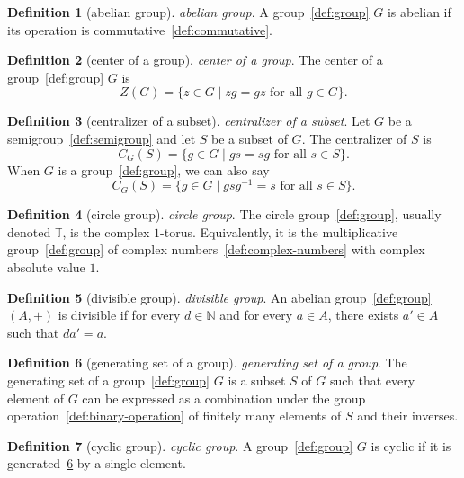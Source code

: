 \documentclass[12pt,a4paper]{article}
\theoremstyle{definition}
\newtheorem{definition}{Definition}
\begin{document}
\begin{definition}[abelian group]\label{def:abelian-group}
\emph{abelian group}. A group~\ref{def:group} $G$ is abelian if its operation is commutative~\ref{def:commutative}.
\end{definition}

\begin{definition}[center of a group]\label{def:center-of-a-group}
\emph{center of a group}. The center of a group~\ref{def:group} $G$ is $$Z(G) = \{z\in G\mid zg=gz \text{ for all } g\in G\}.$$
\end{definition}

\begin{definition}[centralizer of a subset]\label{def:centralizer-of-a-subset}
\emph{centralizer of a subset}. Let $G$ be a semigroup~\ref{def:semigroup} and let $S$ be a subset of $G$. The centralizer of $S$ is $$C_G(S) = \{g\in G\mid gs=sg \text{ for all } s\in S\}.$$ When $G$ is a group~\ref{def:group}, we can also say $$C_G(S) = \{g\in G\mid gsg^{-1} =s \text{ for all } s\in S\}.$$
\end{definition}

\begin{definition}[circle group]\label{def:circle-group}
\emph{circle group}. The circle group~\ref{def:group}, usually denoted $\mathbb T$, is the complex $1$-torus. Equivalently, it is the multiplicative group~\ref{def:group} of complex numbers~\ref{def:complex-numbers} with complex absolute value $1$.
\end{definition}

\begin{definition}[divisible group]\label{def:divisible-group}
\emph{divisible group}. An abelian group~\ref{def:group} $(A,+)$ is divisible if for every $d\in \mathbb N$ and for every $a\in A$, there exists $a'\in A$ such that $da' = a$.
\end{definition}

\begin{definition}[generating set of a group]\label{def:generating-set-of-a-group}
\emph{generating set of a group}. The generating set of a group~\ref{def:group} $G$ is a subset $S$ of $G$ such that every element of $G$ can be expressed as a combination under the group operation~\ref{def:binary-operation} of finitely many elements of $S$ and their inverses.
\end{definition}

\begin{definition}[cyclic group]\label{def:cyclic-group}
\emph{cyclic group}. A group~\ref{def:group} $G$ is cyclic if it is generated~\ref{def:generating-set-of-a-group} by a single element.
\end{definition}
\end{document}

